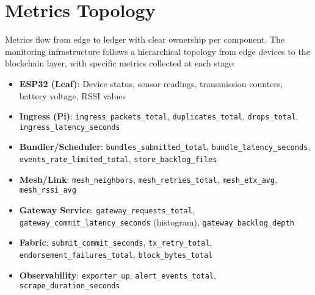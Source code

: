 \documentclass[12pt]{article}
\newcommand{\code}[1]{\texttt{\nolinkurl{#1}}}
\newcommand{\code}[1]{\texttt{\nolinkurl{#1}}}
\begin{document}
\section{Metrics Topology}
\label{sec:metrics}

Metrics flow from edge to ledger with clear ownership per component. The monitoring infrastructure follows a hierarchical topology from edge devices to the blockchain layer, with specific metrics collected at each stage:

\begin{itemize}
    \item \textbf{ESP32 (Leaf)}: Device status, sensor readings, transmission counters, battery voltage, RSSI values
    \item \textbf{Ingress (Pi)}: \code{ingress_packets_total}, \code{duplicates_total}, \code{drops_total}, \code{ingress_latency_seconds}
    \item \textbf{Bundler/Scheduler}: \code{bundles_submitted_total}, \code{bundle_latency_seconds}, \code{events_rate_limited_total}, \code{store_backlog_files}
    \item \textbf{Mesh/Link}: \code{mesh_neighbors}, \code{mesh_retries_total}, \code{mesh_etx_avg}, \code{mesh_rssi_avg}
    \item \textbf{Gateway Service}: \code{gateway_requests_total}, \code{gateway_commit_latency_seconds} (histogram), \code{gateway_backlog_depth}
    \item \textbf{Fabric}: \code{submit_commit_seconds}, \code{tx_retry_total}, \code{endorsement_failures_total}, \code{block_bytes_total}
    \item \textbf{Observability}: \code{exporter_up}, \code{alert_events_total}, \code{scrape_duration_seconds}
\end{itemize}
\end{document}
